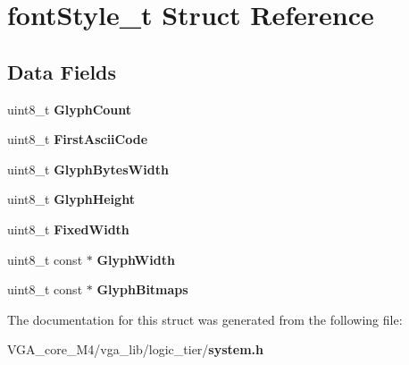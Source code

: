 \section{font\+Style\+\_\+t Struct Reference}
\label{structfont_style__t}
\subsection*{Data Fields}
\begin{DoxyCompactItemize}
\item 
uint8\+\_\+t {\bfseries Glyph\+Count}\label{structfont_style__t_a05163e401b6db5ed0518b84813bead19}

\item 
uint8\+\_\+t {\bfseries First\+Ascii\+Code}\label{structfont_style__t_acc2367540ae2f27a2a1cb7661b262302}

\item 
uint8\+\_\+t {\bfseries Glyph\+Bytes\+Width}\label{structfont_style__t_a7a67cfdaf21aeee0007b20855a156414}

\item 
uint8\+\_\+t {\bfseries Glyph\+Height}\label{structfont_style__t_a64bf014a4cd25d55cd66e4a6c582bf35}

\item 
uint8\+\_\+t {\bfseries Fixed\+Width}\label{structfont_style__t_aa8c38fcad3b1a66c53cfc68a74c9e961}

\item 
uint8\+\_\+t const $\ast$ {\bfseries Glyph\+Width}\label{structfont_style__t_aa74366ab083178d425825f0a13b92c24}

\item 
uint8\+\_\+t const $\ast$ {\bfseries Glyph\+Bitmaps}\label{structfont_style__t_a2c67211cfd4f667452fa63ab0d00e9a7}

\end{DoxyCompactItemize}


The documentation for this struct was generated from the following file\+:\begin{DoxyCompactItemize}
\item 
V\+G\+A\+\_\+core\+\_\+\+M4/vga\+\_\+lib/logic\+\_\+tier/{\bf system.\+h}\end{DoxyCompactItemize}
